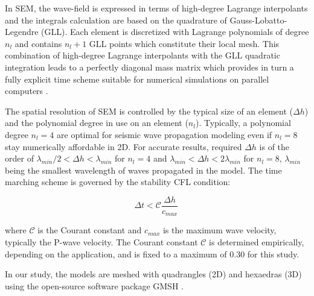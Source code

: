 \documentclass[manuscript,revised]{geophysics}
\begin{document}
\noindent In SEM, the wave-field is expressed in terms of high-degree Lagrange interpolants and the integrals calculation are based on the quadrature of Gauss-Lobatto-Legendre (GLL). Each element is discretized with Lagrange polynomials of degree $n_{l}$ and contains $n_{l}+1$ GLL points which constitute their local mesh. This combination of high-degree Lagrange interpolants with the GLL quadratic integration leads to a perfectly diagonal mass matrix which provides in turn a fully explicit time scheme suitable for numerical simulations on parallel computers \citep{komatitsch1998spectral,komatitsch1999spectral}.

\noindent The spatial resolution of SEM is controlled by the typical size of an element ($\Delta h$) and the polynomial degree in use on an element ($n_{l}$). Typically, a polynomial degree $n_{l}=4$ are optimal for seismic wave propagation modeling \citep{moczo2011finite} even if $n_{l}=8$ stay numerically affordable in 2D. For accurate results, required $\Delta h$ is of the order of $\lambda_{min} /2 < \Delta h < \lambda_{min}$ for $n_{l}=4$ and $\lambda_{min} < \Delta h < 2\lambda_{min}$ for $n_{l}=8$, $\lambda_{min}$ being the smallest wavelength of waves propagated in the model. The time marching scheme is governed by the stability CFL condition:

\begin{equation}
	\Delta t < \mathcal{C}\frac{\Delta h}{c_{max}}\,   
\end{equation}

\noindent where $\mathcal{C}$ is the Courant constant and $c_{max}$ is the maximum wave velocity, typically the P-wave velocity. The Courant constant $\mathcal{C}$ is determined empirically, depending on the application, and is fixed to a maximum of 0.30 for this study.

\noindent In our study, the models are meshed with quadrangles (2D) and hexaedras (3D) using the open-source software package GMSH \citep{Geuzaine_MSH_2009}. 

\end{document}
